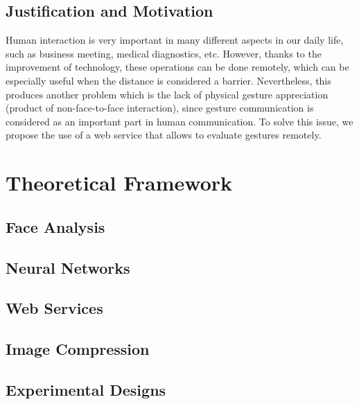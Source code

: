 \documentclass[12pt,letterpaper,titlepage]{book}
\begin{document}
\section{Justification and Motivation}
Human interaction is very important in many different aspects in our daily life, such as business meeting, medical diagnostics, etc. However, thanks to the improvement of technology, these operations can be done remotely, which can be especially useful when the distance is considered a barrier. Nevertheless, this produces another problem which is the lack of physical gesture appreciation (product of non-face-to-face interaction), since gesture communication is considered as an important part in human communication. To solve this issue, we propose the use of a web service that allows to evaluate gestures remotely.

\chapter{Theoretical Framework}\label{capII}
\section{Face Analysis}
	
\section{Neural Networks}
	
\section{Web Services}
	
\section{Image Compression}
	
\section{Experimental Designs}
	

\end{document}
